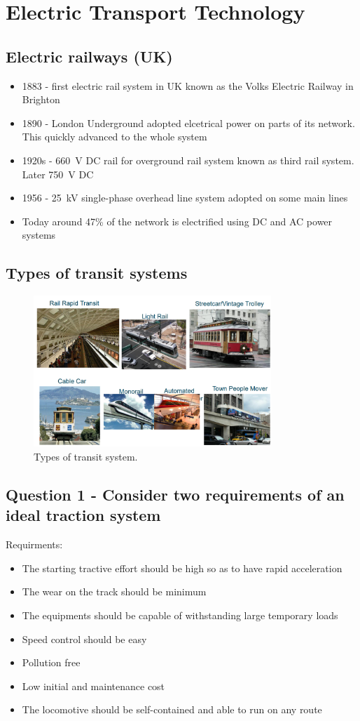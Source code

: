 \chapter{Electric Transport Technology}
\section{Electric railways (UK)}
\begin{itemize}
    \item 1883 - first electric rail system in UK known as the Volks Electric Railway in Brighton
    \item 1890 - London Underground adopted elcetrical power on parts of its network. This quickly advanced to the whole system
    \item 1920s - \SI{660}{\volt} DC rail for overground rail system known as third rail system. Later \SI{750}{\volt} DC
    \item 1956 - \SI{25}{\kilo\volt} single-phase overhead line system adopted on some main lines
    \item Today around 47\% of the network is electrified using DC and AC power systems
\end{itemize}
\section{Types of transit systems}
\begin{figure}[H]
    \centering
    \includegraphics[width = 0.8\textwidth]{img/figure116.png}
    \caption{Types of transit system.}
\end{figure}
\section{Question 1 - Consider two requirements of an ideal traction system}
Requirments:
\begin{itemize}
    \item The starting tractive effort should be high so as to have rapid acceleration
    \item The wear on the track should be minimum
    \item The equipments should be capable of withstanding large temporary loads
    \item Speed control should be easy
    \item Pollution free
    \item Low initial and maintenance cost
    \item The locomotive should be self-contained and able to run on any route
\end{itemize}
